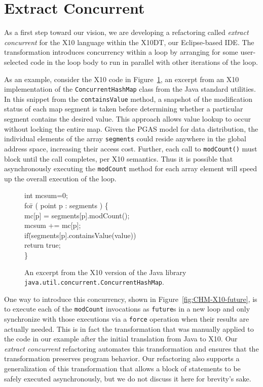 \documentclass[natbib]{sigplanconf}
\newenvironment{code}{\begin{center}\begin{small}\begin{tt}\begin{tabbing}}
{\end{tabbing}\end{tt}\end{small}\end{center}}
\begin{document}
\section{Extract Concurrent}

As a first step toward our vision, we are developing a refactoring
called {\em extract
concurrent} for the X10 language within the X10DT, our Eclipse-based IDE. 
The transformation introduces concurrency within a loop by arranging
for some user-selected code in the loop body 
to run in parallel with other iterations of the 
loop.

As an example, consider the X10 code in Figure~\ref{fig:CHM-X10}, an excerpt from
an X10 implementation of the {\tt ConcurrentHashMap} class from the Java 
standard utilities. In this snippet from the {\tt containsValue} method,
a snapshot of the modification status of each map segment is taken before
determining whether a particular segment contains the desired value. This
approach allows value lookup to occur without locking the entire map. Given
the PGAS model for data distribution, the individual elements of the array 
{\tt segments} could reside anywhere in the global address space, increasing
their access cost. Further, each call to {\tt modCount()} must block until the
call completes, per X10 semantics. Thus it is possible that asynchronously
executing the {\tt modCount} method for each array element will speed up the
overall execution of the loop.

\begin{figure}[tp]
  \begin{code}
int mcsum=0; \\
fo\=r ( point p : segments ) \{ \\
\>  mc[p] = segments[p].modCount(); \\
\>  mcsum += mc[p]; \\
\>  if\=(segments[p].containsValue(value)) \\
\>\>    return true; \\
\}
  \end{code}
\caption{\label{fig:CHM-X10} An excerpt from the X10 version of the Java 
library {\tt java.util.concurrent.ConcurrentHashMap}.
}
\end{figure}

One way to introduce this concurrency, shown in Figure~\ref{fig:CHM-X10-future},
is to execute each of the {\tt modCount} invocations as {\tt future}s in a new loop
and only synchronize with those executions via a {\tt force}
operation when their results are actually needed.
This is in fact the transformation that was manually applied to
the code in our example after the initial translation
from Java to X10.  Our
{\em extract concurrent} refactoring automates this transformation and
ensures that the transformation preserves program behavior.  Our
refactoring also supports a generalization of this transformation that
allows a block of statements to be safely executed asynchronously,
but we do not discuss it here for brevity's sake.
\end{document}
